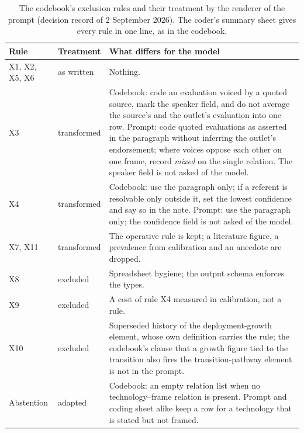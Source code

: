 \begin{table}[htbp]
\centering\scriptsize
\setlength{\tabcolsep}{4pt}
\caption[Exclusion rules in the codebook and in the prompt]{The codebook's exclusion rules and their treatment by the renderer of the prompt (decision record of 2 September 2026). The coder's summary sheet gives every rule in one line, as in the codebook.}\label{tab:rule_concordance}
\begin{tabular}{@{}>{\raggedright\arraybackslash}p{15mm}>{\raggedright\arraybackslash}p{20mm}>{\raggedright\arraybackslash}p{117mm}@{}}
\toprule
\textbf{Rule} & \textbf{Treatment} & \textbf{What differs for the model} \\
\midrule
X1, X2, X5, X6 & as written & Nothing. \\
X3 & transformed & Codebook: code an evaluation voiced by a quoted source, mark the speaker field, and do not average the source's and the outlet's evaluation into one row. Prompt: code quoted evaluations as asserted in the paragraph without inferring the outlet's endorsement; where voices oppose each other on one frame, record \emph{mixed} on the single relation. The speaker field is not asked of the model. \\
X4 & transformed & Codebook: use the paragraph only; if a referent is resolvable only outside it, set the lowest confidence and say so in the note. Prompt: use the paragraph only; the confidence field is not asked of the model. \\
X7, X11 & transformed & The operative rule is kept; a literature figure, a prevalence from calibration and an anecdote are dropped. \\
X8 & excluded & Spreadsheet hygiene; the output schema enforces the types. \\
X9 & excluded & A cost of rule X4 measured in calibration, not a rule. \\
X10 & excluded & Superseded history of the deployment-growth element, whose own definition carries the rule; the codebook's clause that a growth figure tied to the transition also fires the transition-pathway element is not in the prompt. \\
Abstention & adapted & Codebook: an empty relation list when no technology--frame relation is present. Prompt and coding sheet alike keep a row for a technology that is stated but not framed. \\
\bottomrule
\end{tabular}
\end{table}

